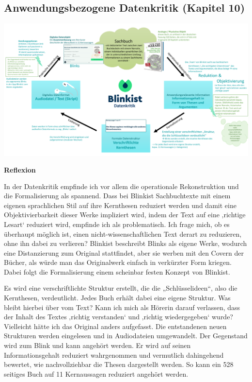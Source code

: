 \documentclass[
  a4paper,
]{book}
\begin{document}
\subsection*{Anwendungsbezogene Datenkritik (Kapitel 10)}\label{anwendungsbezogene-datenkritik-kapitel-10}

\begin{center}\includegraphics{Figures/10-Bsp.1} \end{center}

\textbf{Reflexion}

In der Datenkritik empfinde ich vor allem die operationale Rekonstruktion und die Formalisierung als spannend. Dass bei Blinkist Sachbuchtexte mit einem eigenen sprachlichen Stil auf ihre Kernthesen reduziert werden und damit eine Objektivierbarkeit dieser Werke impliziert wird, indem der Text auf eine ‚richtige Lesart` reduziert wird, empfinde ich als problematisch. Ich frage mich, ob es überhaupt möglich ist, einen nicht-wissenschaftlichen Text derart zu reduzieren, ohne ihn dabei zu verlieren? Blinkist beschreibt Blinks als eigene Werke, wodurch eine Distanzierung zum Original stattfindet, aber sie werben mit den Covern der Bücher, als würde man das Originalwerk einfach in verkürzter Form kriegen. Dabei folgt die Formalisierung einem scheinbar festen Konzept von Blinkist.

Es wird eine verschriftlichte Struktur erstellt, die die „Schlüsselideen``, also die Kernthesen, verdeutlicht. Jedes Buch erhält dabei eine eigene Struktur. Was bleibt hierbei über vom Text? Kann ich mich als Hörerin darauf verlassen, dass der Inhalt des Textes ‚richtig verstanden` und ‚richtig wiedergegeben` wurde? Vielleicht hätte ich das Original anders aufgefasst. Die entstandenen neuen Strukturen werden eingelesen und in Audiodateien umgewandelt. Der Gegenstand wird zum Blink und kann angehört werden. Er wird auf seinen Informationsgehalt reduziert wahrgenommen und vermutlich dahingehend bewertet, wie nachvollziehbar die Thesen dargestellt werden. So kann ein 528 seitiges Buch auf 11 Kernaussagen reduziert angehört werden.
\end{document}

